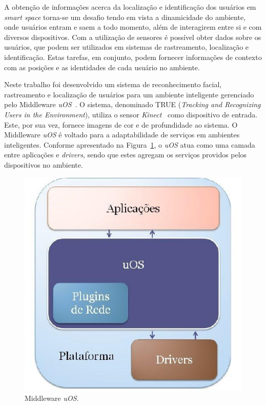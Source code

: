 
A obtenção de informações acerca da localização e identificação dos usuários em \textit{smart space} torna-se um desafio tendo em vista a dinamicidade do ambiente, onde usuários entram e saem a todo momento, além de interagirem entre si e
com diversos dispositivos. Com a utilização de sensores é
possível obter dados sobre os usuários, que podem ser utilizados em
sistemas de rastreamento, localização e identificação. Estas tarefas, em
conjunto, podem fornecer informações de contexto com as posições e as
identidades de cada usuário no ambiente.
	
Neste trabalho foi desenvolvido um sistema de reconhecimento facial, rastreamento e
localização de usuários para um ambiente inteligente gerenciado pelo Middleware \textit{uOS}~\cite{fabriciobuzzeto}. O sistema, denominado TRUE (\textit{Tracking and Recognizing Users in the Environment}), utiliza o
sensor \textit{Kinect}~\cite{kinect_microsoft} como dispositivo de entrada. Este, por
sua vez, fornece imagens de cor e de profundidade ao sistema. O Middleware \textit{uOS} é voltado para a adaptabilidade de serviços em ambientes inteligentes. Conforme apresentado na Figura~\ref{fig:uos}, o \textit{uOS} atua como uma camada entre aplicações e \textit{drivers}, sendo que estes agregam os serviços providos pelos dispositivos no ambiente.

\begin{figure}[htb]
		\begin{center}
			\includegraphics[scale=0.3]{figuras/1.Introducao/dsoa.jpg}
		\end{center}
		\caption{Middleware \textit{uOS}.}
		\label{fig:uos}
	\end{figure}


